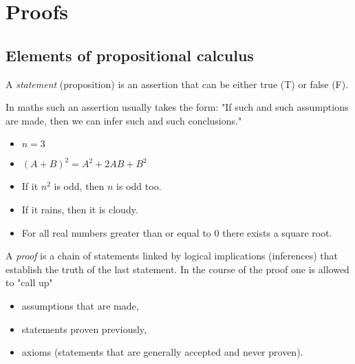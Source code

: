 \section{Proofs}
\subsection{Elements of propositional calculus}
\begin{df}
A \emph{statement} (proposition) is an assertion that can be either true (T) or false (F).
\end{df}

\begin{rk}
In maths such an assertion usually takes the form:
"If such and such assumptions are made, then we can infer such and such conclusions."
 \end{rk}

\begin{ex} 
\begin{itemize}
\item
$n  = 3$
\item
$(A+B)^2  = A^2 + 2AB + B^2$
\item
If it $n^2$ is odd, then $n$ is odd too.
\item
If it rains, then it is cloudy.
\item
For all real numbers greater than or equal to 0 there exists a square root. 
\end{itemize}
\end{ex}



\begin{df}
A \emph{proof} is a chain of statements linked by logical implications (inferences) that establish the truth of the last statement. In the course of the proof one is allowed to "call up" 
\begin{itemize}
\item
 assumptions that are made,
\item
 statements proven previously,
\item
 axioms (statements that are generally accepted and never proven).
\end{itemize}
\end{df}



